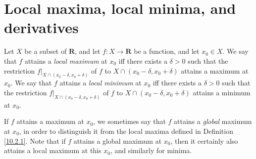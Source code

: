 \section{Local maxima, local minima, and derivatives}\label{sec 10.2}

\begin{definition}\label{10.2.1}
    Let \(X\) be a subset of \(\mathbf{R}\), and let \(f : X \to \mathbf{R}\) be a function, and let \(x_0 \in X\).
    We say that \(f\) attains a \emph{local maximum} at \(x_0\) iff there exists a \(\delta > 0\) such that the restriction \(f|_{X \cap (x_0 - \delta, x_0 + \delta)}\) of \(f\) to \(X \cap (x_0 - \delta, x_0 + \delta)\) attains a maximum at \(x_0\).
    We say that \(f\) attains a \emph{local minimum} at \(x_0\) iff there exists a \(\delta > 0\) such that the restriction \(f|_{X \cap (x_0 - \delta, x_0 + \delta)}\) of \(f\) to \(X \cap (x_0 - \delta, x_0 + \delta)\) attains a minimum at \(x_0\).
\end{definition}

\begin{remark}\label{10.2.2}
    If \(f\) attains a maximum at \(x_0\), we sometimes say that \(f\) attains a \emph{global} maximum at \(x_0\), in order to distinguish it from the local maxima defined in Definition \ref{10.2.1}.
    Note that if \(f\) attains a global maximum at \(x_0\), then it certainly also attains a local maximum at this \(x_0\), and similarly for minima.
\end{remark}